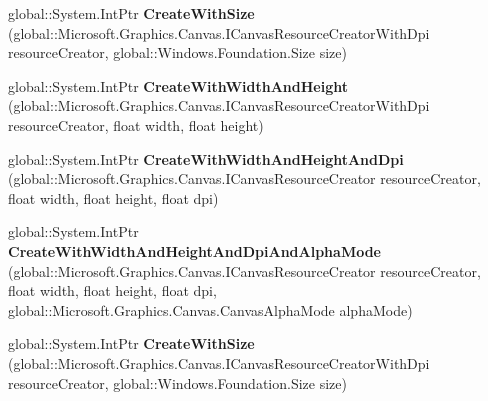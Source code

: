 \begin{DoxyCompactItemize}
global\+::\+System.\+Int\+Ptr {\bfseries Create\+With\+Size} (global\+::\+Microsoft.\+Graphics.\+Canvas.\+I\+Canvas\+Resource\+Creator\+With\+Dpi resource\+Creator, global\+::\+Windows.\+Foundation.\+Size size)
\item 
\mbox{\label{interface_microsoft_1_1_graphics_1_1_canvas_1_1_u_i_1_1_xaml_1_1_i_canvas_virtual_image_source_factory_a5ce3deeb7f455cd4077cd79f1a73628d}} 
global\+::\+System.\+Int\+Ptr {\bfseries Create\+With\+Width\+And\+Height} (global\+::\+Microsoft.\+Graphics.\+Canvas.\+I\+Canvas\+Resource\+Creator\+With\+Dpi resource\+Creator, float width, float height)
\item 
\mbox{\label{interface_microsoft_1_1_graphics_1_1_canvas_1_1_u_i_1_1_xaml_1_1_i_canvas_virtual_image_source_factory_a8dec48ae093e81783bc8f960229a0cd0}} 
global\+::\+System.\+Int\+Ptr {\bfseries Create\+With\+Width\+And\+Height\+And\+Dpi} (global\+::\+Microsoft.\+Graphics.\+Canvas.\+I\+Canvas\+Resource\+Creator resource\+Creator, float width, float height, float dpi)
\item 
\mbox{\label{interface_microsoft_1_1_graphics_1_1_canvas_1_1_u_i_1_1_xaml_1_1_i_canvas_virtual_image_source_factory_ac23a6e94d90c7e30a156e1261f94f38c}} 
global\+::\+System.\+Int\+Ptr {\bfseries Create\+With\+Width\+And\+Height\+And\+Dpi\+And\+Alpha\+Mode} (global\+::\+Microsoft.\+Graphics.\+Canvas.\+I\+Canvas\+Resource\+Creator resource\+Creator, float width, float height, float dpi, global\+::\+Microsoft.\+Graphics.\+Canvas.\+Canvas\+Alpha\+Mode alpha\+Mode)
\item 
\mbox{\label{interface_microsoft_1_1_graphics_1_1_canvas_1_1_u_i_1_1_xaml_1_1_i_canvas_virtual_image_source_factory_a6ef2ceb8efc3356922c19a0c886c01a9}} 
global\+::\+System.\+Int\+Ptr {\bfseries Create\+With\+Size} (global\+::\+Microsoft.\+Graphics.\+Canvas.\+I\+Canvas\+Resource\+Creator\+With\+Dpi resource\+Creator, global\+::\+Windows.\+Foundation.\+Size size)
\item 

\end{DoxyCompactItemize}

